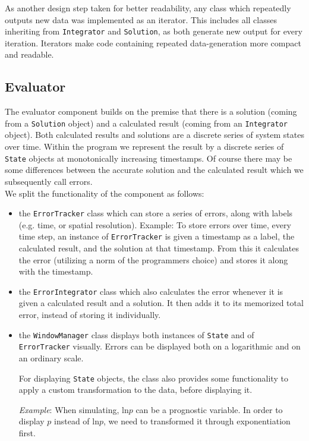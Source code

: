 As another design step taken for better readability, any class which repeatedly outputs new data was implemented as an iterator.
This includes all classes inheriting from \texttt{Integrator} and \texttt{Solution}, as both generate new output for every iteration.
Iterators make code containing repeated data-generation more compact and readable.

\subsection*{Evaluator}
The evaluator component builds on the premise that there is a solution (coming from a \texttt{Solution} object) and a calculated result (coming from an \texttt{Integrator} object).
Both calculated results and solutions are a discrete series of system states over time.
Within the program we represent the result by a discrete series of \texttt{State} objects at monotonically increasing timestamps.
Of course there may be some differences between the accurate solution and the calculated result which we subsequently call errors.
\\

\noindent
We split the functionality of the component as follows:
\begin{itemize}
\item the \texttt{ErrorTracker} class which can store a series of errors, along with labels (e.g. time, or spatial resolution).
Example: To store errors over time, every time step, an instance of \texttt{ErrorTracker} is given a timestamp as a label, the calculated result, and the solution at that timestamp.
From this it calculates the error (utilizing a norm of the programmers choice) and stores it along with the timestamp.
\item the \texttt{ErrorIntegrator} class which also calculates the error whenever it is given a calculated result and a solution.
It then adds it to its memorized total error, instead of storing it individually.
\item the \texttt{WindowManager} class displays both instances of \texttt{State} and of \texttt{ErrorTracker} visually.
Errors can be displayed both on a logarithmic and on an ordinary scale.

For displaying \texttt{State} objects, the class also provides some functionality to apply a custom transformation to the data, before displaying it.

\emph{Example}: When simulating, $\text{ln}p$ can be a prognostic variable.
In order to display $p$ instead of $\text{ln}p$, we need to transformed it through exponentiation first.
\end{itemize}

